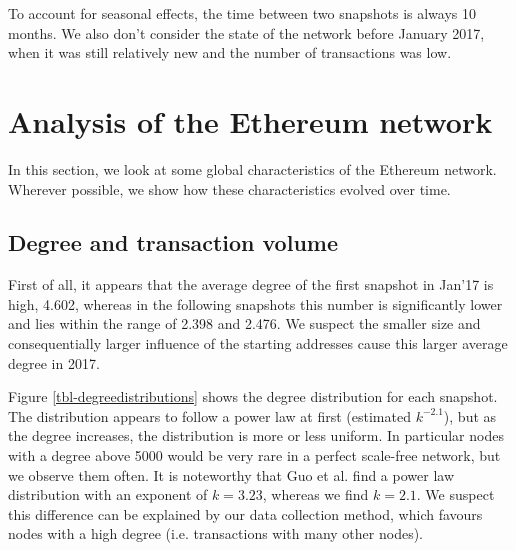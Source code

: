 \documentclass[10pt,a4paper]{article}
\begin{document}
\begin{multicols}{2}
To account for seasonal effects, the time between two snapshots is always 10 months. We also don't consider the state of the network before January 2017, when it was still relatively new and the number of transactions was low.

\section{Analysis of the Ethereum network}
In this section, we look at some global characteristics of the Ethereum network. Wherever possible, we show how these characteristics evolved over time.
\subsection{Degree and transaction volume}
First of all, it appears that the average degree of the first snapshot in Jan'17 is high, 4.602, whereas in the following snapshots this number is significantly lower and lies within the range of 2.398 and 2.476. We suspect the smaller size and consequentially larger influence of the starting addresses cause this larger average degree in 2017.

Figure \ref{tbl-degreedistributions} shows the degree distribution for each snapshot. The distribution appears to follow a power law at first (estimated $k^{-2.1}$), but as the degree increases, the distribution is more or less uniform. In particular nodes with a degree above 5000 would be very rare in a perfect scale-free network, but we observe them often. It is noteworthy that Guo et al. \cite{GUO201958} find a power law distribution with an exponent of $k = 3.23$, whereas we find $k=2.1$. We suspect this difference can be explained by our data collection method, which favours nodes with a high degree (i.e. transactions with many other nodes).
\end{multicols}
\end{document}
